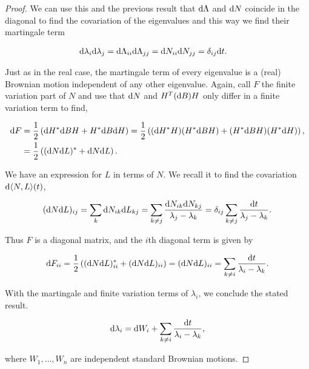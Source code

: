 \begin{proof}
    
    We can use this and the previous result that $\mathrm d \Lambda$ and $\mathrm d N$ coincide in the diagonal to find the covariation of the eigenvalues and this way we find their martingale term
    
    \begin{align*}
        \mathrm d \lambda_i\mathrm d \lambda_j &= \mathrm d \Lambda_{ii} \mathrm d\Lambda_{jj} = \mathrm d N_{ii}\mathrm d N_{jj} = \delta_{ij}\mathrm d t.
    \end{align*}

    Just as in the real case, the martingale term of every eigenvalue is a (real) Brownian motion independent of any other eigenvalue. Again, call $F$ the finite variation part of $N$ and use that $\mathrm d N$ and $H^T (\mathrm d B) H$ only differ in a finite variation term to find,

    \begin{align*}
        \mathrm d F &= \frac12\left( \mathrm d H^* \mathrm d B H + H^* \mathrm d B \mathrm d H \right) = \frac12\left( (\mathrm d H^* H)(H^*\mathrm d B H) + (H^* \mathrm d B H)(H^* \mathrm d H) \right),\\ 
        &= \frac12\left( (\mathrm d N \mathrm d L)^* + \mathrm d N \mathrm d L  \right).
    \end{align*}

    We have an expression for $L$ in terms of $N$. We recall it to find the covariation $\mathrm d \langle N, L\rangle(t)$, 

    \begin{equation*}
        (\mathrm d N \mathrm d L)_{ij} = \sum_{k} \mathrm d N_{ik}\mathrm d L_{kj} = \sum_{k\neq j} \frac{\mathrm d N_{ik}\mathrm d N_{kj}}{\lambda_j - \lambda_k} = \delta_{ij} \sum_{k\neq j} \frac{\mathrm d t}{\lambda_j - \lambda_k}.
    \end{equation*}

    Thus $F$ is a diagonal matrix, and the $i$th diagonal term is given by

    \begin{equation*}
        \mathrm d F_{ii} = \frac12\left( (\mathrm d N \mathrm d L)^*_{ii} + (\mathrm d N \mathrm d L)_{ii}  \right) = (\mathrm d N \mathrm d L)_{ii} = \sum_{k\neq i} \frac{\mathrm d t}{\lambda_i - \lambda_k}.
    \end{equation*}

    With the martingale and finite variation terms of $\lambda_i$, we conclude the stated result.

    \begin{equation*}
        \mathrm d \lambda_i = \mathrm d W_i + \sum_{k\neq i} \frac{\mathrm d t }{\lambda_i - \lambda_k},
    \end{equation*}

    \noindent where $W_1, \dots, W_n$ are independent standard Brownian motions.
\end{proof}










